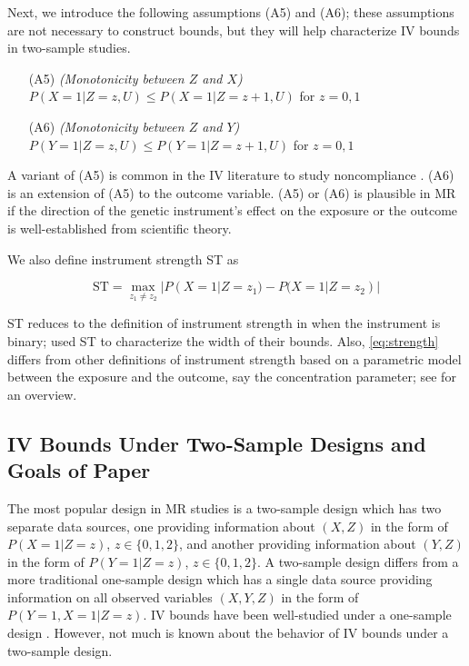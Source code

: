 \documentclass[
]{article}
\theoremstyle{plain}
\begin{document}
Next, we introduce the following assumptions (A5) and (A6); these assumptions are not necessary to construct bounds, but they will help characterize IV bounds in two-sample studies.

\begin{itemize}
\item[(A5)] \emph{(Monotonicity between $Z$ and $X$)} $P(X = 1 | Z = z, U) \le P(X = 1 | Z = z+1, U)$ for $z=0,1$
\item[(A6)] \emph{(Monotonicity between $Z$ and $Y$)} $P(Y = 1 | Z = z, U) \le P(Y = 1 | Z = z+1, U)$ for $z=0,1$
\end{itemize}

A variant of (A5) is common in the IV literature to study noncompliance \autocite{angrist_identification_1996,baiocchi_instrumental_2014}. (A6) is an extension of (A5) to the outcome variable. (A5) or (A6) is plausible in MR if the direction of the genetic instrument's effect on the exposure or the outcome is well-established from scientific theory.

We also define instrument strength ST as

\begin{equation}
\text{ST} = \max_{z_1 \neq z_2} | P(X = 1 | Z = z_1) - P(X = 1 | Z = z_2) | \label{eq:strength}
\end{equation}

ST reduces to the definition of instrument strength in \textcite{balke_bounds_1997} when the instrument is binary; \textcite{balke_bounds_1997} used ST to characterize the width of their bounds. Also, \eqref{eq:strength} differs from other definitions of instrument strength based on a parametric model between the exposure and the outcome, say the concentration parameter; see \textcite{stock_survey_2002} for an overview.

\hypertarget{iv-bounds-under-two-sample-designs-and-goals-of-paper}{%
\subsection{IV Bounds Under Two-Sample Designs and Goals of Paper}\label{iv-bounds-under-two-sample-designs-and-goals-of-paper}}

\label{review-study-designs-and-target-estimand}

The most popular design in MR studies is a two-sample design which has two separate data sources, one providing information about \((X,Z)\) in the form of \(P(X = 1 | Z = z)\), \(z \in \{0, 1, 2\}\), and another providing information about \((Y,Z)\) in the form of \(P(Y = 1 | Z = z)\), \(z \in \{0, 1, 2\}\). A two-sample design differs from a more traditional one-sample design which has a single data source providing information on all observed variables \((X,Y,Z)\) in the form of \(P(Y = 1, X=1 | Z = z)\). IV bounds have been well-studied under a one-sample design \autocite{balke_bounds_1997,richardson_ace_2014,swanson_partial_2018}. However, not much is known about the behavior of IV bounds under a two-sample design.
\end{document}
